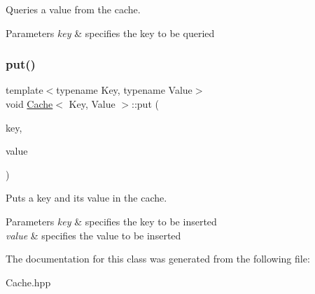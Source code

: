 Queries a value from the cache. 


\begin{DoxyParams}{Parameters}
{\em key} & specifies the key to be queried \\
\hline
\end{DoxyParams}
\mbox{\label{classCache_a7b54629fb513d4b1652951bb713a0635}} 
\subsubsection{\texorpdfstring{put()}{put()}}
{\footnotesize\ttfamily template$<$typename Key, typename Value$>$ \\
void \hyperlink{classCache}{Cache}$<$ Key, Value $>$\+::put (\begin{DoxyParamCaption}\item[{const Key \&}]{key,  }\item[{const Value \&}]{value }\end{DoxyParamCaption})\hspace{0.3cm}{\ttfamily [inline]}}



Puts a key and its value in the cache. 


\begin{DoxyParams}{Parameters}
{\em key} & specifies the key to be inserted \\
\hline
{\em value} & specifies the value to be inserted \\
\hline
\end{DoxyParams}


The documentation for this class was generated from the following file\+:\begin{DoxyCompactItemize}
\item 
Cache.\+hpp\end{DoxyCompactItemize}
